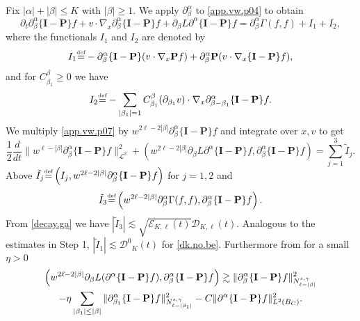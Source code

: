 \documentclass{amsart}
\numberwithin{equation}{section}
\begin{document}
  Fix $|{\alpha}|+|{\beta}|\leq {K}$ with $|{\beta}|\geq 1$. We apply ${\partial}^{\alpha}_{\beta}$ to \eqref{app.vw.p04} to obtain
\begin{equation}
{\partial}_t {\partial}^{\alpha}_{\beta} \{{\mathbf{I}}-{\mathbf{P}}\} {f} +{v}\cdot {\nabla}_x {\partial}^{\alpha}_{\beta} \{{\mathbf{I}}-{\mathbf{P}}\} {f} + 
{\partial}_{\beta}{L} {\partial}^{\alpha} \{{\mathbf{I}}-{\mathbf{P}}\} {f} ={\partial}_{\beta}^{\alpha} {\Gamma}({f},{f})+I_1+I_2,\label{app.vw.p07}
\end{equation}
where the functionals $I_1$ and $I_2$ are denoted by
$$
I_1{\overset{\mbox{\tiny{def}}}{=}}-{\partial}_{\beta}^{\alpha}\{{\mathbf{I}}-{\mathbf{P}}\}({v} \cdot {\nabla}_x {\mathbf{P}} {f} )
+{\partial}_{\beta}^{\alpha}{\mathbf{P}} ({v} \cdot {\nabla}_x \{{\mathbf{I}}-{\mathbf{P}}\}{f} ),
$$
and for $C_{{\beta}_1}^{\beta} \ge 0$ we have 
$$
  I_2 {\overset{\mbox{\tiny{def}}}{=}} -\sum_{|\beta_1|=1} C_{{\beta}_1}^{\beta} ({\partial}_{{\beta}_1}{v})\cdot {\nabla}_x  {\partial}^{\alpha}_{{\beta}-{\beta}_1} \{{\mathbf{I}}-{\mathbf{P}}\} {f}.
$$
We multiply \eqref{app.vw.p07} by $w^{2{\ell}-2|\beta|} {\partial}^{\alpha}_{\beta} \{{\mathbf{I}}-{\mathbf{P}}\} {f}$ and integrate over $x,{v}$ to get
$$
\frac{1}{2}\frac{d}{dt}\|w^{{\ell}-|\beta|}{\partial}^{\alpha}_{\beta} \{{\mathbf{I}}-{\mathbf{P}}\} {f}\|^2_{{\mathcal{L}}^2}
+
\left(w^{2{\ell}-2|\beta|}{\partial}_{\beta}{L} {\partial}^{\alpha} \{{\mathbf{I}}-{\mathbf{P}}\} {f},{\partial}^{\alpha}_{\beta} \{{\mathbf{I}}-{\mathbf{P}}\} {f}\right)
=
\sum_{j=1}^3\tilde{I}_j.
$$
Above $\tilde{I}_j {\overset{\mbox{\tiny{def}}}{=}} \left( I_j, w^{2{\ell}-2|\beta|} {\partial}^{\alpha}_{\beta} \{{\mathbf{I}}-{\mathbf{P}}\} {f}\right)$ for $j=1,2$ and
$$
\tilde{I}_3 {\overset{\mbox{\tiny{def}}}{=}}  
\left(w^{2{\ell}-2|\beta|} {\partial}_{\beta}^{\alpha} {\Gamma}({f},{f}),{\partial}^{\alpha}_{\beta} \{{\mathbf{I}}-{\mathbf{P}}\} {f}\right).
$$
From \eqref{decay.ga} we have 
$
\left| \tilde{I}_3 \right| 
\lesssim
\sqrt{{\mathcal{E}}_{{K},{\ell}}(t)}{\mathcal{D}}_{{K},{\ell}}(t).
$
Analogous to the estimates in Step 1, 
$
\left| \tilde{I}_1 \right|
\lesssim
{{\mathcal{D}}^0}_{K}(t)
$
for \eqref{dk.no.be}.
Furthermore from \cite[Lemma 2.6]{gsNonCut0} for a small $\eta>0$
\begin{multline}\notag
\left(w^{2{\ell}-2|\beta|}{\partial}_{\beta}{L} ({\partial}^{\alpha} \{{\mathbf{I}}-{\mathbf{P}}\} {f}),{\partial}^{\alpha}_{\beta} \{{\mathbf{I}}-{\mathbf{P}}\} {f}\right)
\gtrsim
\| \partial^{\alpha}_{\beta}\{{\mathbf{I}}-{\mathbf{P}}\} {f}\|_{N^{s,\gamma}_{\ell - |\beta|}}^2   
\\  
-
\eta
\sum_{|\beta_1| \le |\beta|}\| \partial^{\alpha}_{\beta_1} \{{\mathbf{I}}-{\mathbf{P}}\} {f}\|_{N^{s,\gamma}_{\ell - |\beta_1|}}^2  
-
C     \| \partial^\alpha \{{\mathbf{I}}-{\mathbf{P}}\} {f}\|_{L^2(B_{C})}^2.
\end{multline}
\end{document}
